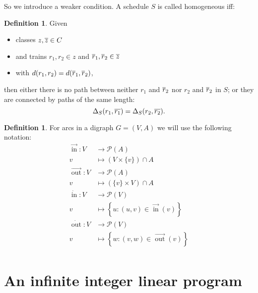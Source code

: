 \documentclass[a4paper]{amsart}
\theoremstyle{definition}
\newtheorem{defn}[theorem]{Definition}
\theoremstyle{remark}
\DeclareMathOperator{\In}{in}
\DeclareMathOperator{\Out}{out}
\newcommand{\ina}{\ensuremath{\vec{\In}}}
\newcommand{\outa}{\ensuremath{\vec{\Out}}}
\newcommand{\inv}{\ensuremath{\dot{\In}}}
\newcommand{\outv}{\ensuremath{\dot{\Out}}}
\begin{document}
So we introduce a weaker condition.  A schedule \(S\) is called
homogeneous iff:
\begin{defn} Given
  \begin{itemize}
  \item classes \(z, \overline{z} \in C\)
  \item and trains \(r_1, r_2 \in z\) and \(\overline{r}_1,\overline{r}_2 \in \overline{z}\)
  \item with \( d (r_1, r_2) = d(\overline{r}_1, \overline{r}_2) \),
\end{itemize}
  then either there is no path between neither \(r_1\) and
    \(\overline{r}_2\) nor \(r_2\) and \(\overline{r}_2\) in \(S\); or they are connected by paths of the same length:
    \begin{equation}
      \label{homoEq}
      \Delta_S (r_1, \overline{r_1}) = \Delta_S (r_2, \overline{r_2})\textrm{.}
    \end{equation}
\end{defn}

\begin{defn}
For arcs in a digraph \(G=(V,A)\) we will use the following notation:
\begin{align*}
\ina\colon  V &\to \mathcal{P}(A) \\
v &\mapsto \left(V \times \{v\}\right) \cap A\\
\outa\colon  V &\to \mathcal{P}(A) \\
v &\mapsto \left(\{v\} \times V\right) \cap A\\
\inv\colon  V &\to \mathcal{P}(V) \\
v &\mapsto \left\{ u \colon \left(u,v\right) \in \ina(v) \right\}\\
\outv\colon  V &\to \mathcal{P}(V) \\
v &\mapsto \left\{w \colon \left(v,w\right) \in \outa\left(v\right) \right\}\\
\end{align*}
\end{defn}

\section{An infinite integer linear program}
\label{infIP}
\end{document}
